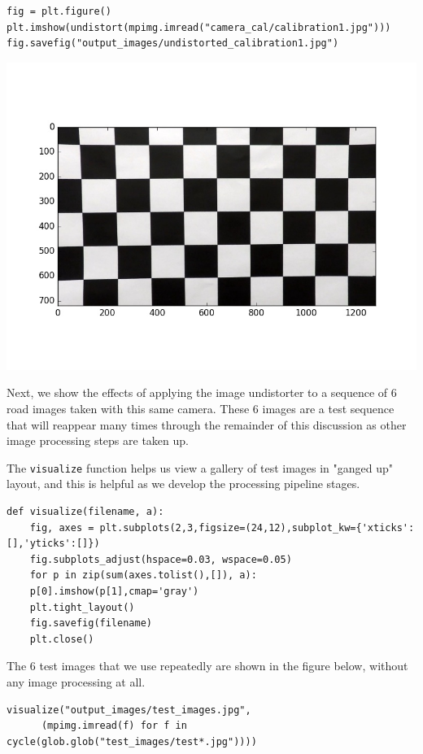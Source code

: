 \documentclass[11pt]{article}
\begin{document}
\begin{verbatim}
fig = plt.figure()
plt.imshow(undistort(mpimg.imread("camera_cal/calibration1.jpg")))
fig.savefig("output_images/undistorted_calibration1.jpg")
\end{verbatim}

\includegraphics[width=.9\linewidth]{output_images/undistorted_calibration1.jpg}

Next, we show the effects of applying the image undistorter to a
sequence of 6 road images taken with this same camera.  These 6
images are a test sequence that will reappear many times through
the remainder of this discussion as other image processing steps
are taken up.

The \texttt{visualize} function helps us view a gallery of test images
in "ganged up" layout, and this is helpful as we develop the
processing pipeline stages.

\begin{verbatim}
def visualize(filename, a):
    fig, axes = plt.subplots(2,3,figsize=(24,12),subplot_kw={'xticks':[],'yticks':[]})
    fig.subplots_adjust(hspace=0.03, wspace=0.05)
    for p in zip(sum(axes.tolist(),[]), a):
	p[0].imshow(p[1],cmap='gray')
    plt.tight_layout()
    fig.savefig(filename)
    plt.close()
\end{verbatim}

The 6 test images that we use repeatedly are shown in the figure
below, without any image processing at all.

\begin{verbatim}
visualize("output_images/test_images.jpg",
	  (mpimg.imread(f) for f in cycle(glob.glob("test_images/test*.jpg"))))
\end{verbatim}
\end{document}

